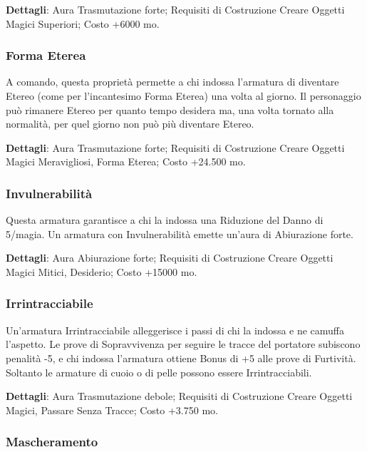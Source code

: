 \begin{multicols}{2}
\textbf{Dettagli}: Aura Trasmutazione forte; Requisiti di Costruzione Creare Oggetti Magici Superiori; Costo +6000 mo.

\subsubsection*{Forma Eterea}

A comando, questa proprietà permette a chi indossa l'armatura di diventare Etereo (come per l'incantesimo Forma Eterea) una volta al giorno. Il personaggio può rimanere Etereo per quanto tempo desidera ma, una volta tornato alla normalità, per quel giorno non può più diventare Etereo.

\textbf{Dettagli}: Aura Trasmutazione forte; Requisiti di Costruzione Creare Oggetti Magici Meravigliosi, Forma Eterea; Costo +24.500 mo.

\subsubsection*{Invulnerabilità}

Questa armatura garantisce a chi la indossa una Riduzione del Danno di 5/magia. Un armatura con Invulnerabilità emette un'aura di Abiurazione forte.

\textbf{Dettagli}: Aura Abiurazione forte; Requisiti di Costruzione Creare Oggetti Magici Mitici, Desiderio; Costo +15000 mo.

\subsubsection*{Irrintracciabile}

Un'armatura Irrintracciabile alleggerisce i passi di chi la indossa e ne camuffa l'aspetto. Le prove di Sopravvivenza per seguire le tracce del portatore subiscono penalità -5, e chi indossa l'armatura ottiene Bonus di +5 alle prove di Furtività. Soltanto le armature di cuoio o di pelle possono essere Irrintracciabili.

\textbf{Dettagli}: Aura Trasmutazione debole; Requisiti di Costruzione Creare Oggetti Magici, Passare Senza Tracce; Costo +3.750 mo.

\subsubsection*{Mascheramento}


\end{multicols}
